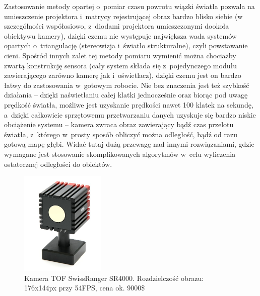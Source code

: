 Zastosowanie metody opartej o~pomiar czasu powrotu wiązki światła pozwala na
umieszczenie projektora i~matrycy rejestrującej obraz bardzo blisko siebie (w
szczególności współosiowo, z~diodami projektora umieszczonymi dookoła obiektywu
kamery), dzięki czemu nie występuje największa wada systemów opartych
o~triangulację (stereowizja i~światło strukturalne), czyli powstawanie cieni.
Spośród innych zalet tej metody pomiaru wymienić można chociażby zwartą
konstrukcję sensora (cały system składa się z~pojedynczego modułu zawierającego
zarówno kamerę jak i~oświetlacz), dzięki czemu jest on bardzo łatwy do
zastosowania w~gotowym robocie. Nie bez znaczenia jest też szybkość działania --
dzięki naświetlaniu całej klatki jednocześnie oraz biorąc pod uwagę prędkość
światła, możliwe jest uzyskanie prędkości nawet 100 klatek na sekundę, a~dzięki
całkowicie sprzętowemu przetwarzaniu danych uzyskuje się bardzo niskie
obciążenie systemu -- kamera zwraca obraz zawierający bądź czas przelotu
światła, z~którego w~prosty sposób obliczyć można odległość, bądź od razu gotową
mapę głębi. Widać tutaj dużą przewagę nad innymi rozwiązaniami, gdzie wymagane
jest stosowanie skomplikowanych algorytmów w~celu wyliczenia ostatecznej
odległości do obiektów.

\begin{figure}[h!]
\centering
\includegraphics[height=5cm]{../../Common/img/sr4000}
\caption[Kamera TOF SwissRanger SR4000]{Kamera TOF SwissRanger SR4000.
Rozdzielczość obrazu: 176x144px przy 54FPS, cena ok. 9000\$}
\label{fig:sr4000}
\end{figure}

